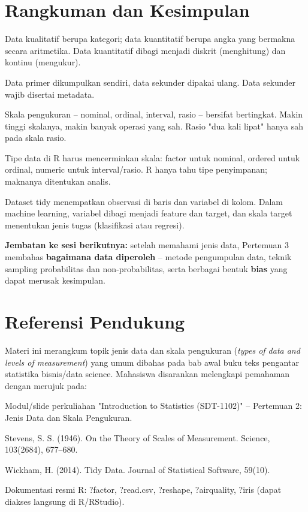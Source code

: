 \documentclass[
  indonesian,
  letterpaper,
]{book}
\begin{document}
\section{Rangkuman dan Kesimpulan}\label{rangkuman-dan-kesimpulan-1}

Data kualitatif berupa kategori; data kuantitatif berupa angka yang
bermakna secara aritmetika. Data kuantitatif dibagi menjadi diskrit
(menghitung) dan kontinu (mengukur).

Data primer dikumpulkan sendiri, data sekunder dipakai ulang. Data
sekunder wajib disertai metadata.

Skala pengukuran -- nominal, ordinal, interval, rasio -- bersifat
bertingkat. Makin tinggi skalanya, makin banyak operasi yang sah. Rasio
"dua kali lipat" hanya sah pada skala rasio.

Tipe data di R harus mencerminkan skala: factor untuk nominal, ordered
untuk ordinal, numeric untuk interval/rasio. R hanya tahu tipe
penyimpanan; maknanya ditentukan analis.

Dataset tidy menempatkan observasi di baris dan variabel di kolom. Dalam
machine learning, variabel dibagi menjadi feature dan target, dan skala
target menentukan jenis tugas (klasifikasi atau regresi).

\textbf{Jembatan ke sesi berikutnya:} setelah memahami jenis data,
Pertemuan 3 membahas \textbf{bagaimana data diperoleh} -- metode
pengumpulan data, teknik sampling probabilitas dan non-probabilitas,
serta berbagai bentuk \textbf{bias} yang dapat merusak kesimpulan.

\section{Referensi Pendukung}\label{referensi-pendukung-1}

Materi ini merangkum topik jenis data dan skala pengukuran (\emph{types
of data and levels of measurement}) yang umum dibahas pada bab awal buku
teks pengantar statistika bisnis/data science. Mahasiswa disarankan
melengkapi pemahaman dengan merujuk pada:

Modul/slide perkuliahan "Introduction to Statistics (SDT-1102)" --
Pertemuan 2: Jenis Data dan Skala Pengukuran.

Stevens, S. S. (1946). On the Theory of Scales of Measurement. Science,
103(2684), 677--680.

Wickham, H. (2014). Tidy Data. Journal of Statistical Software, 59(10).

Dokumentasi resmi R: ?factor, ?read.csv, ?reshape, ?airquality, ?iris
(dapat diakses langsung di R/RStudio).
\end{document}
